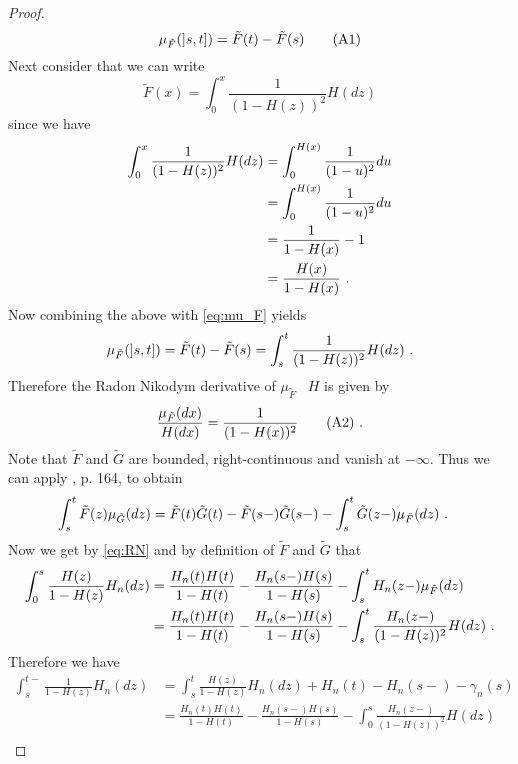 \begin{lemma}
\begin{proof}
		\begin{equation*}
		\mu_{\tilde F}(]s,t]) =\tilde  F(t) - \tilde F(s)  \numberthis\label{eq:mu_F}
		\end{equation*}
		Next consider that we can write
		$$\tilde F(x) = \int_{0}^{x} \frac{1}{(1-H(z))^2} H(dz)$$ 
		since we have
		\begin{align*}
		\int_{0}^{x} \frac{1}{(1-H(z))^2} H(dz) &= \int_{0}^{H(x)} \frac{1}{(1-u)^2} du\\
		&= \int_{0}^{H(x)} \frac{1}{(1-u)^2} du\\
		&= \frac{1}{1-H(x)} - 1\\
		&= \frac{H(x)}{1-H(x)}\textrm{ .}
		\end{align*}
		Now combining the above with \eqref{eq:mu_F} yields
		\begin{align*}
		\mu_{\tilde F}(]s,t]) = \tilde  F(t) - \tilde F(s)  = \int_{s}^{t} \frac{1}{(1-H(z))^2} H(dz)\textrm{ .}
		\end{align*}	
		Therefore the Radon Nikodym derivative of $\mu_{\tilde F}$ \wrt\ $H$ is given by
		\begin{equation*}
		\frac{\mu_{\tilde F}(dx)}{H(dx)} = \frac{1}{(1-H(x))^2} \numberthis\label{eq:RN}\mdot
		\end{equation*}
		Note that $\tilde{F}$ and $\tilde{G}$ are bounded, right-continuous and vanish at $-\infty$. Thus we can apply \cite{cohn2013measure}, p. 164, to obtain
		\begin{align*}
		\int_{s}^{t} \tilde{F}(z) \mu_{\tilde G}(dz) &=\tilde F(t) \tilde G(t) - \tilde F(s-) \tilde G(s-) - \int_{s}^{t} \tilde G(z-) \mu_{\tilde F}(dz)\textrm{ .}
		\end{align*}
		Now we get by \eqref{eq:RN} and by definition of $\tilde F$ and $\tilde G$ that
		\begin{align*}
		\int_{0}^{s} \frac{H(z)}{1-H(z)} H_n(dz) &=\frac{H_n(t)H(t)}{1-H(t)} - \frac{H_n(s-)H(s)}{1-H(s)} - \int_{s}^{t} H_n(z-) \mu_{\tilde F}(dz)\\
		&=\frac{H_n(t)H(t)}{1-H(t)} - \frac{H_n(s-)H(s)}{1-H(s)} - \int_{s}^{t} \frac{H_n(z-)}{(1-H(z))^2} H(dz)\textrm{ .}
		\end{align*}	 
		Therefore we have
		\begin{align*}
		\int_{s}^{t-} \frac{1}{1-H(z)} H_n(dz) &= \int_{s}^{t} \frac{H(z)}{1-H(z)} H_n(dz) + H_n(t) - H_n(s-) - \gamma_n(s)\\ 
		&=\frac{H_n(t)H(t)}{1-H(t)} - \frac{H_n(s-)H(s)}{1-H(s)} - \int_{0}^{s} \frac{H_n(z-)}{(1-H(z))^2} H(dz)\\

\end{align*}
\end{proof}
\end{lemma}
